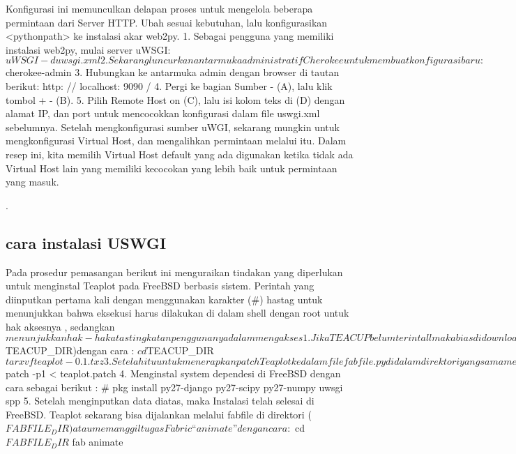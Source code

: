 Konfigurasi ini memunculkan delapan proses untuk mengelola beberapa permintaan dari
Server HTTP. Ubah sesuai kebutuhan, lalu konfigurasikan <pythonpath> ke instalasi
akar web2py.
1.	Sebagai pengguna yang memiliki instalasi web2py, mulai server uWSGI: $ uWSGI -d uwsgi.xml
2.	Sekarang luncurkan antarmuka administratif Cherokee untuk membuat konfigurasi baru:
$ cherokee-admin
3.	Hubungkan ke antarmuka admin dengan browser di tautan berikut:
http: // localhost: 9090 /
4.	Pergi ke bagian Sumber - (A), lalu klik tombol + - (B).
5.	Pilih Remote Host on (C), lalu isi kolom teks di (D) dengan alamat IP, dan port untuk mencocokkan konfigurasi dalam file uswgi.xml sebelumnya. Setelah mengkonfigurasi sumber uWGI, sekarang mungkin untuk mengkonfigurasi Virtual Host, dan mengalihkan permintaan melalui itu. Dalam resep ini, kita memilih Virtual Host default yang ada digunakan ketika tidak ada Virtual Host lain yang memiliki kecocokan yang lebih baik untuk permintaan yang masuk.

\cite{mulone2012web2py}.

\subsection{cara instalasi USWGI}
Pada prosedur pemasangan berikut ini menguraikan tindakan yang diperlukan untuk menginstal Teaplot pada  FreeBSD berbasis sistem. Perintah yang diinputkan pertama kali  dengan menggunakan karakter  (#) hastag  untuk menunjukkan bahwa eksekusi harus dilakukan di dalam shell dengan root untuk hak aksesnya , sedangkan $ menunjukkan hak-hak atas tingkatan penggunanya dalam mengakses

1.	Jika TEACUP belum terintall maka bias didownload maelalui laman http://downloads.sourceforge.net/
	project/teacup/teacup-1.0.tar.gz. Informasi tambahan dapat diperoleh dari laporan CAIA nya.
2.	kemudian kita extract arsip instalasi Teaplotnya kedalam  TEACUP  dengan direktorinya ($TEACUP_DIR)dengan cara :
	$ cd $TEACUP_DIR
	$ tar xvf teaplot-0.1.txz
3.	Setelah itu untuk menerapkan patch Teaplot kedalam file fabfile.py didalam direktori yang sama menggunakan peintah :
	$ patch -p1 < teaplot.patch
4.	Menginstal system dependesi di FreeBSD dengan cara sebagai berikut :
 	# pkg install py27-django py27-scipy py27-numpy uwsgi spp
5.	Setelah menginputkan data diatas, maka Instalasi telah selesai di FreeBSD. Teaplot sekarang bisa dijalankan melalui fabfile di
	direktori ($FABFILE_DIR) atau memanggil tugas Fabric “animate” dengan cara :
	$ cd $FABFILE_DIR
	$ fab animate

